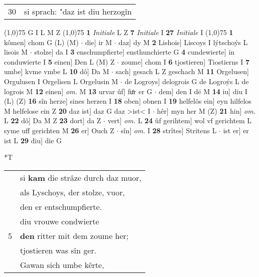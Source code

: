 \documentclass[8pt,a4paper,notitlepage]{article}
\begin{document}
\begin{table}[ht]
\begin{minipage}[t]{0.5\linewidth}
\begin{tabular}{rl}
30 & si sprach: "daz ist diu herzogîn\\ 
\end{tabular}
\scriptsize
\line(1,0){75} \newline
G I L M Z \newline
\line(1,0){75} \newline
\textbf{1} \textit{Initiale} L Z  \textbf{7} \textit{Initiale} I  \textbf{27} \textit{Initiale} I  \newline
\line(1,0){75} \newline
\textbf{1} kômen] chom G (L) (M)  $\cdot$ die] ir M  $\cdot$ daz] dy M \textbf{2} Lishois] Liscoys I lýtschoýs L lisois M  $\cdot$ stolze] da I \textbf{3} enschumpfierte] ensthunchierte G \textbf{4} cundewierte] in conduwierte I \textbf{5} einen] Den L (M) Z  $\cdot$ zoume] chom I \textbf{6} tjostieren] Tiostierns I \textbf{7} umbe] kvme vmbe L \textbf{10} dô] Da M  $\cdot$ sach] gesach L Z geschach M \textbf{11} Orgelusen] Orgulusen I Orgelisen L Orgelusin M  $\cdot$ de Logroys] delogrois G de Logroýs L de logrois M \textbf{12} einen] \textit{om.} M \textbf{13} urvar ûf] fuͦr er G  $\cdot$ dem] den I dē M \textbf{14} iu] diu I (L) (Z) \textbf{16} sîn herze] sines herzen I \textbf{18} oben] obnen I \textbf{19} helfelôs ein] eyn hilfelos M helfelose ein Z \textbf{20} daz ist] daz G daz >ist< I  $\cdot$ hêr] myn her M (Z) \textbf{21} hin] \textit{om.} L \textbf{22} dô] Da M Z \textbf{23} dort] da Z  $\cdot$ vert] \textit{om.} L \textbf{24} ûf gerihtem] wol vf gerichtem L syme uff gerichten M \textbf{26} er] Ouch Z  $\cdot$ sîn] \textit{om.} I \textbf{28} strîtes] Stritens L  $\cdot$ ist er] er ist L \textbf{29} diu] die G \newline
\end{minipage}
\hspace{0.5cm}
\begin{minipage}[t]{0.5\linewidth}
\small
\begin{center}*T
\end{center}
\begin{tabular}{rl}
 & si \textbf{kam} die strâze durch daz muor,\\ 
 & als Lyschoys, der stolze, vuor,\\ 
 & den er entschumpfierte.\\ 
 & diu vrouwe condwierte\\ 
5 & \textbf{den} ritter mit dem zoume her;\\ 
 & tjostieren was sîn ger.\\ 
 & Gawan sich umbe kêrte,\\ 

\end{tabular}
\end{minipage}
\end{table}
\end{document}
